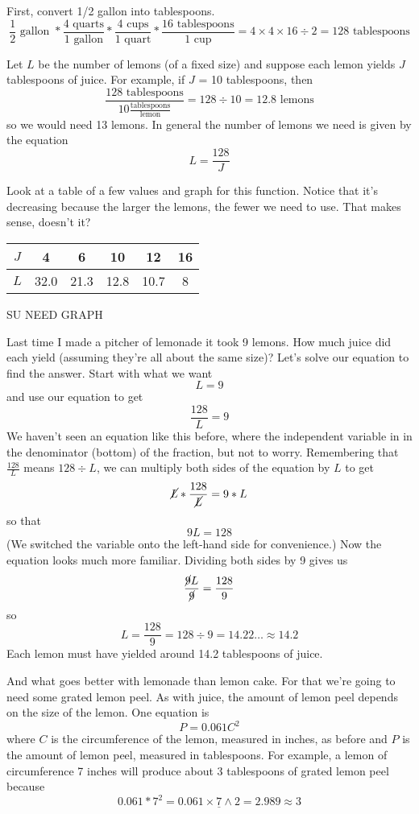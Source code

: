 First, convert 1/2 gallon into tablespoons. $$\frac{1}{2} \text{ gallon } \ast \frac{4 \text{ quarts}}{1 \text{ gallon}} \ast \frac{4 \text{ cups}}{1 \text{ quart}} \ast \frac{16 \text{ tablespoons}}{1 \text{ cup}} = 4 \times 4 \times 16 \div 2 = 128 \text{ tablespoons}$$

Let $L$ be the number of lemons (of a fixed size) and suppose each lemon yields $J$ tablespoons of juice. For example, if $J$ = 10 tablespoons, then $$\frac{128 \text{ tablespoons}}{10 \frac{\text{tablespoons}}{\text{lemon}}} = 128 \div 10 = 12.8 \text{ lemons}$$ so we would need 13 lemons.  In general the number of lemons we need is given by the equation $$L=\frac{128}{J}$$ 

Look at a table of a few values and graph for this function.  Notice that it's decreasing because the larger the lemons, the fewer we need to use.  That makes sense, doesn't it?

\begin{center}
\begin{tabular} {|c |c |c |c |c |c|}\hline
$J$ & 4 & 6 & 10 & 12 &16 \\ \hline
$L$ & 32.0 & 21.3 & 12.8 & 10.7 & 8 \\ \hline
\end{tabular}
\end{center}

SU NEED GRAPH \vspace{2in}

Last time I made a pitcher of lemonade it took 9 lemons. How much juice did each yield (assuming they're all about the same size)?  Let's solve our equation to find the answer.  Start with what we want $$L=9$$ and use our equation to get $$\frac{128}{L}=9$$  We haven't seen an equation like this before, where the independent variable in in the denominator (bottom) of the fraction, but not to worry. Remembering that $\frac{128}{L}$ means $128 \div L$, we can multiply both sides of the equation by $L$ to get $$\cancel{L}\ast\frac{128}{\cancel{L}} = 9\ast L$$ so that $$9L=128$$  (We switched the variable onto the left-hand side for convenience.)  Now the equation looks much more familiar.  Dividing both sides by 9 gives us $$\frac{\cancel{9}L}{\cancel{9}}= \frac{128}{9}$$ so $$L=\frac{128}{9} = 128\div 9 = 14.22\ldots \approx 14.2 $$  Each lemon must have yielded around 14.2 tablespoons of juice.

And what goes better with lemonade than lemon cake.  For that we're going to need some grated lemon peel.  As with juice, the amount of lemon peel depends on the size of the lemon.  One equation is $$P=0.061C^2$$ where $C$ is the circumference of the lemon, measured in inches, as before and $P$ is the amount of lemon peel, measured in tablespoons.  For example, a lemon of circumference 7 inches will produce about 3 tablespoons of grated lemon peel because $$0.061\ast7^2 = 0.061 \times \underline{7} \wedge 2 = 2.989 \approx 3$$

